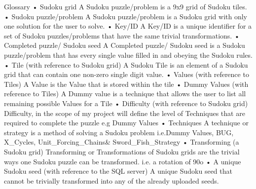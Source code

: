 \documentclass[fleqn]{article}
\begin{document}
Glossary
•	Sudoku grid
A Sudoku puzzle/problem is a 9x9 grid of Sudoku tiles.
•	Sudoku puzzle/problem
A Sudoku puzzle/problem is a Sudoku grid with only one solution for the user to solve.
•	Key/ID
A Key/ID is a unique identifier for a set of Sudoku puzzles/problems that have the same trivial transformations.
•	Completed puzzle/ Sudoku seed
A Completed puzzle/ Sudoku seed is a Sudoku puzzle/problem that has every single value filled in and obeying the Sudoku rules.
•	Tile (with reference to Sudoku grid)
A Sudoku Tile is an element of a Sudoku grid that can contain one non-zero single digit value.
•	Values (with reference to Tiles)
A Value is the Value that is stored within the tile
•	Dummy Values (with reference to Tiles)
A Dummy value is a technique that allows the user to list all remaining possible Values for a Tile 
•	Difficulty (with reference to Sudoku grid)
Difficulty, in the scope of my project will define the level of Techniques that are required to complete the puzzle e.g Dummy Values
•	Techniques
A technique or strategy is a method of solving a Sudoku problem i.e.Dummy Values, BUG, X_Cycles, Unit_Forcing_Chains& Sword_Fish_Strategy
•	Transforming (a Sudoku grid)
Transforming or Transformations of Sudoku grids are the trivial ways one Sudoku puzzle can be transformed. i.e. a rotation of 90o
•	A unique Sudoku seed (with reference to the SQL server)
A unique Sudoku seed that cannot be trivially transformed into any of the already uploaded seeds.
\end{document}
